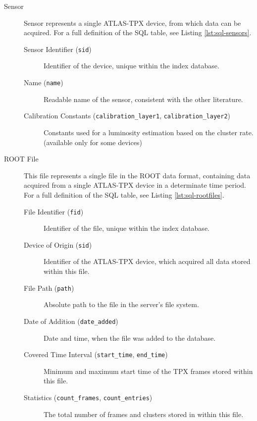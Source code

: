 \todo

\label{db:definition}
\begin{description}
	\item[Sensor]
	Sensor represents a single ATLAS-TPX device, from which data can be acquired. For a full definition of the SQL table, see Listing \ref{lst:sql-sensors}.

	\begin{description}
		\item[Sensor Identifier (\texttt{sid})]
		Identifier of the device, unique within the index database.

		\item[Name (\texttt{name})]
		Readable name of the sensor, consistent with the other literature.

		\item[Calibration Constants (\texttt{calibration\_layer1}, \texttt{calibration\_layer2})]
		Constants used for a luminosity estimation based on the cluster rate. \cite{MeasuringRadiation} (available only for some devices)
	\end{description}

	\item[ROOT File]
	This file represents a single file in the ROOT data format, containing data acquired from a single ATLAS-TPX device in a determinate time period. For a full definition of the SQL table, see Listing \ref{lst:sql-rootfiles}.

	\begin{description}
		\item[File Identifier (\texttt{fid})] 
		Identifier of the file, unique within the index database.

		\item[Device of Origin (\texttt{sid})]
		Identifier of the ATLAS-TPX device, which acquired all data stored within this file.

		\item[File Path (\texttt{path})] 
		Absolute path to the file in the server's file system.

		\item[Date of Addition (\texttt{date\_added})]
		Date and time, when the file was added to the database.

		\item[Covered Time Interval (\texttt{start\_time}, \texttt{end\_time})]
		Minimum and maximum start time of the TPX frames stored within this file.

		\item[Statistics (\texttt{count\_frames}, \texttt{count\_entries})]
		The total number of frames and clusters stored in within this file.


\end{description}
\end{description}
